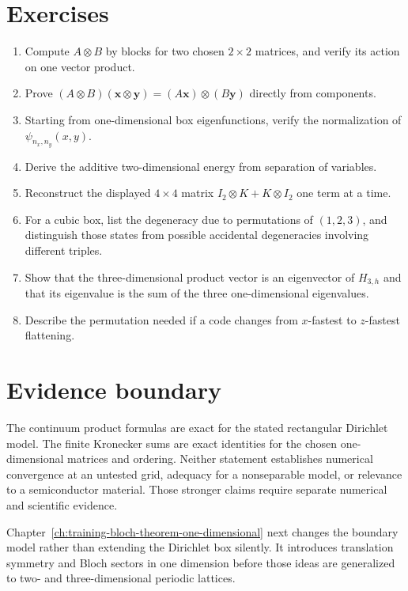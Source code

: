 \section{Exercises}

\begin{enumerate}
  \item Compute \(A\otimes B\) by blocks for two chosen \(2\times2\) matrices,
        and verify its action on one vector product.
  \item Prove
        \((A\otimes B)(\mathbf x\otimes\mathbf y)
        =(A\mathbf x)\otimes(B\mathbf y)\)
        directly from components.
  \item Starting from one-dimensional box eigenfunctions, verify the
        normalization of \(\psi_{n_x,n_y}(x,y)\).
  \item Derive the additive two-dimensional energy from separation of
        variables.
  \item Reconstruct the displayed \(4\times4\) matrix
        \(I_2\otimes K+K\otimes I_2\) one term at a time.
  \item For a cubic box, list the degeneracy due to permutations of
        \((1,2,3)\), and distinguish those states from possible accidental
        degeneracies involving different triples.
  \item Show that the three-dimensional product vector is an eigenvector of
        \(H_{3,h}\) and that its eigenvalue is the sum of the three
        one-dimensional eigenvalues.
  \item Describe the permutation needed if a code changes from \(x\)-fastest
        to \(z\)-fastest flattening.
\end{enumerate}

\section{Evidence boundary}

The continuum product formulas are exact for the stated rectangular Dirichlet
model. The finite Kronecker sums are exact identities for the chosen
one-dimensional matrices and ordering. Neither statement establishes numerical
convergence at an untested grid, adequacy for a nonseparable model, or relevance
to a semiconductor material. Those stronger claims require separate numerical
and scientific evidence.

Chapter~\ref{ch:training-bloch-theorem-one-dimensional} next changes the
boundary model rather than extending the Dirichlet box silently. It introduces
translation symmetry and Bloch sectors in one dimension before those ideas are
generalized to two- and three-dimensional periodic lattices.
